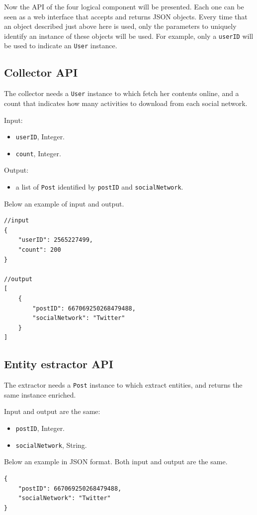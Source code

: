 Now the API of the four logical component will be presented. Each one can be seen as a web interface that accepts and returns JSON objects. Every time that an object described just above here is used, only the parameters to uniquely identify an instance of these objects will be used. For example, only a \texttt{userID} will be used to indicate an \texttt{User} instance.

\subsection{Collector API}
The collector needs a \texttt{User} instance to which fetch her contents online, and a count that indicates how many activities to download from each social network.

Input:
\begin{itemize}
\item \texttt{userID}, Integer.
\item \texttt{count}, Integer.
\end{itemize}

Output:
\begin{itemize}
\item a list of \texttt{Post} identified by \texttt{postID} and \texttt{socialNetwork}.
\end{itemize}

Below an example of input and output.

\begin{Verbatim}
//input
{
	"userID": 2565227499,
	"count": 200
}

//output
[
	{
		"postID": 667069250268479488,
		"socialNetwork": "Twitter"
	}
]
\end{Verbatim}

\subsection{Entity estractor API}
The extractor needs a \texttt{Post} instance to which extract entities, and returns the same instance enriched.

Input and output are the same:
\begin{itemize}
\item \texttt{postID}, Integer.
\item \texttt{socialNetwork}, String.
\end{itemize}

Below an example in JSON format. Both input and output are the same.

\begin{Verbatim}
{
	"postID": 667069250268479488,
	"socialNetwork": "Twitter"
}
\end{Verbatim}

